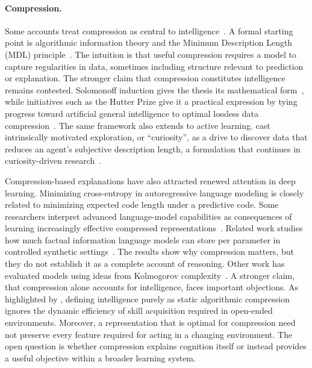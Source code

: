 \documentclass[acmsmall,screen,review,anonymous]{acmart}
\begin{document}
\paragraph{Compression.} Some accounts treat compression as central to intelligence~\citep{ilya2023compress,jackrae2023compress,adam2022compress,3Blue1Brown}. A formal starting point is algorithmic information theory and the Minimum Description Length (MDL) principle~\citep{rissanen1978modeling}.
The intuition is that useful compression requires a model to capture regularities in data, sometimes including structure relevant to prediction or explanation.
%
The stronger claim that compression constitutes intelligence remains contested.
%
Solomonoff induction gives the thesis its mathematical form~\citep{Solomonoff1964AFT1, Solomonoff1964AFT2}, while initiatives such as the Hutter Prize give it a practical expression by tying progress toward artificial general intelligence to optimal lossless data compression~\citep{hutterprize}.
%
The same framework also extends to active learning.
%
\citet{schmidhuber2010, idsiaArtificialCuriosity} cast intrinsically motivated exploration, or ``curiosity'', as a drive to discover data that reduces an agent's subjective description length, a formulation that continues in curiosity-driven research~\citep{sun2011planning, pmlr-v70-pathak17a, amayuelas2026planningexplorecuriositydrivenplanning}.

Compression-based explanations have also attracted renewed attention in deep learning.
%
Minimizing cross-entropy in autoregressive language modeling is closely related to minimizing expected code length under a predictive code.
%
Some researchers interpret advanced language-model capabilities as consequences of learning increasingly effective compressed representations~\citep{deletang2024language, huang2024compression, conklin2026learning}.
%
Related work studies how much factual information language models can store per parameter in controlled synthetic settings~\citep{AL2024-knowledge3}.
%
The results show why compression matters, but they do not establish it as a complete account of reasoning. 
%
Other work has evaluated models using ideas from Kolmogorov complexity~\citep{shaw2026bridging, yoran2025kolmogorov,10.5555/3692070.3692702}.
%
A stronger claim, that compression alone accounts for intelligence, faces important objections. 
%
As highlighted by \citet{chollet2019measureintelligence}, defining intelligence purely as static algorithmic compression ignores the dynamic efficiency of skill acquisition required in open-ended environments. 
%
Moreover, a representation that is optimal for compression need not preserve every feature required for acting in a changing environment. 
%
The open question is whether compression explains cognition itself or instead provides a useful objective within a broader learning system.
\end{document}
